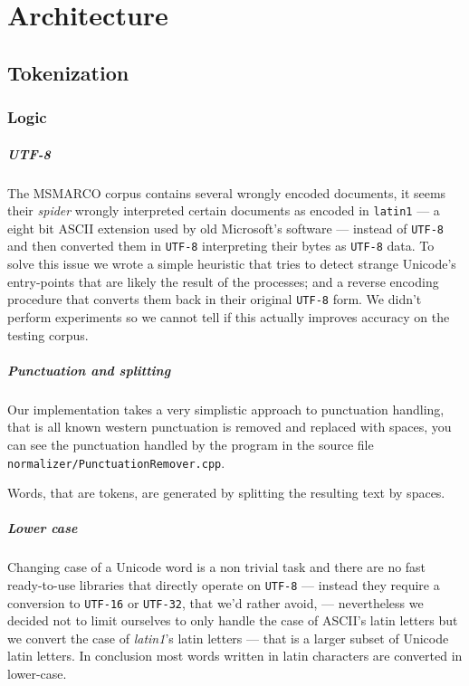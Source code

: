 
\chapter{Architecture}

\section{Tokenization}

\subsection{Logic}

\paragraph{UTF-8} 
The MSMARCO corpus contains several wrongly encoded documents, it seems their \textit{spider} wrongly interpreted certain documents as encoded in \texttt{latin1} --- a eight bit ASCII extension used by old Microsoft's software --- instead of \texttt{UTF-8} and then converted them in \texttt{UTF-8} interpreting their bytes as \texttt{UTF-8} data. To solve this issue we wrote a simple heuristic that tries to detect strange Unicode's entry-points that are likely the result of the processes; and a reverse encoding procedure that converts them back in their original \texttt{UTF-8} form. We didn't perform experiments so we cannot tell if this actually improves accuracy on the testing corpus.

\paragraph{Punctuation and splitting}
Our implementation takes a very simplistic approach to punctuation handling, that is all known western punctuation is removed and replaced with spaces, you can see the punctuation handled by the program in the source file \texttt{normalizer/PunctuationRemover.cpp}.

Words, that are tokens, are generated by splitting the resulting text by spaces.

\paragraph{Lower case}
Changing case of a Unicode word is a non trivial task and there are no fast ready-to-use libraries that directly operate on \texttt{UTF-8} --- instead they require a conversion to \texttt{UTF-16} or \texttt{UTF-32}, that we'd rather avoid, --- nevertheless we decided not to limit ourselves to only handle the case of ASCII's latin letters but we convert the case of \textit{latin1}'s latin letters --- that is a larger subset of Unicode latin letters. In conclusion most words written in latin characters are converted in lower-case.

